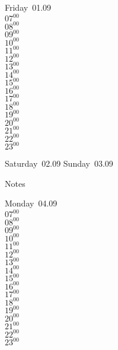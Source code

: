 \documentclass[11pt, a4paper]{book}\usepackage[]{graphicx}\usepackage[]{color}
\begin{document}
\begin{weekdaybox}
  Friday~01.09\\
  { 
  \vfill
  $07^{00}$\\
$08^{00}$\\
$09^{00}$\\
$10^{00}$\\
$11^{00}$\\
$12^{00}$\\
$13^{00}$\\
$14^{00}$\\
$15^{00}$\\
$16^{00}$\\
$17^{00}$\\
$18^{00}$\\
$19^{00}$\\
$20^{00}$\\
$21^{00}$\\
$22^{00}$\\
$23^{00}$\\
  }
\end{weekdaybox}
\begin{weekendbox}
  Saturday~02.09
  \tcblower
  Sunday~03.09
\end{weekendbox} %
\begin{notebox}
  Notes
\end{notebox}
\clearpage
\begin{headerbox}
\end{headerbox}
\begin{weekdaybox}
  Monday~04.09\\
  { 
  \vfill
  $07^{00}$\\
$08^{00}$\\
$09^{00}$\\
$10^{00}$\\
$11^{00}$\\
$12^{00}$\\
$13^{00}$\\
$14^{00}$\\
$15^{00}$\\
$16^{00}$\\
$17^{00}$\\
$18^{00}$\\
$19^{00}$\\
$20^{00}$\\
$21^{00}$\\
$22^{00}$\\
$23^{00}$\\
  }
\end{weekdaybox}
\end{document}
